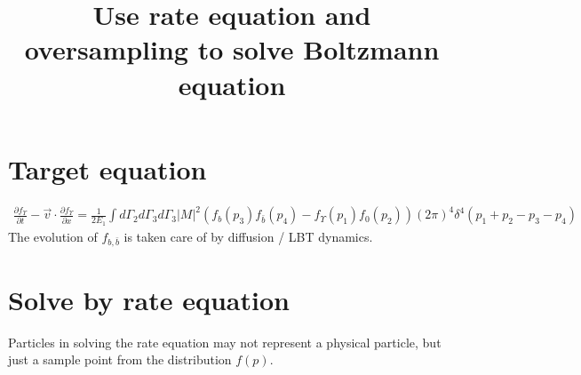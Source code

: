 \documentclass[10pt,a4paper]{article}
\title{Use rate equation and oversampling to solve Boltzmann equation}
\begin{document}
\section{Target equation}
\begin{eqnarray}
\frac{\partial f_\Upsilon}{\partial t} - \vec{v}\cdot\frac{\partial f_\Upsilon}{\partial x}
= \frac{1}{2E_1}\int d\Gamma_2 d\Gamma_3 d\Gamma_3 |M|^2 \left( f_b(p_3)f_{\bar{b}}(p_4)- f_\Upsilon(p_1)f_0(p_2)\right)  (2\pi)^4  \delta^4(p_1+p_2-p_3-p_4) 
\end{eqnarray}
The evolution of $f_{b, \bar{b}}$ is taken care of by diffusion / LBT dynamics.

\section{Solve by rate equation}
Particles in solving the rate equation may not represent a physical particle, but just a sample point from the distribution $f(p)$.
\end{document}
